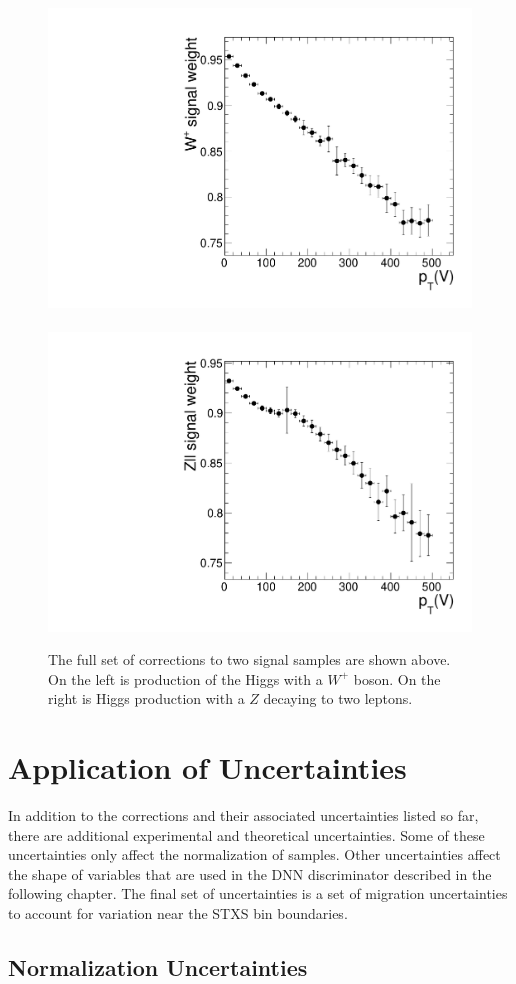 \begin{figure}
  \centering
  \includegraphics[width=0.45\linewidth]{figures/Elektroweak_signal_correction_Wp.pdf} ~
  \includegraphics[width=0.45\linewidth]{figures/Elektroweak_signal_correction_Zll.pdf}
  \caption[Full corrections to signal samples]{
    The full set of corrections to two signal samples are shown above.
    On the left is production of the Higgs with a $W^+$ boson.
    On the right is Higgs production with a $Z$ decaying to two leptons.
  }
  \label{fig:signal-corr-shape}
\end{figure}

\section{Application of Uncertainties}

In addition to the corrections and their associated uncertainties listed so far,
there are additional experimental and theoretical uncertainties.
Some of these uncertainties only affect the normalization of samples.
Other uncertainties affect the shape of variables that are used in the DNN
discriminator described in the following chapter.
The final set of uncertainties is a set of migration uncertainties to account for
variation near the STXS bin boundaries.

\subsection{Normalization Uncertainties}


